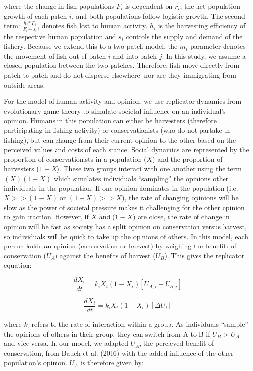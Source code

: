 \documentclass[
  12pt,
]{article}
\begin{document}
where the change in fish populations \(F_i\) is dependent on \(r_i\), the net population growth of each patch \(i\), and both populations follow logistic growth. The second term: \(\frac{h_i*F_i}{F_i + s_i}\), denotes fish lost to human activity. \(h_i\) is the harvesting efficiency of the respective human population and \(s_i\) controls the supply and demand of the fishery. Because we extend this to a two-patch model, the \(m_i\) parameter denotes the movement of fish out of patch \(i\) and into patch \(j\). In this study, we assume a closed population between the two patches. Therefore, fish move directly from patch to patch and do not disperse elsewhere, nor are they immigrating from outside areas.

For the model of human activity and opinion, we use replicator dynamics from evolutionary game theory to simulate societal influence on an individual's opinion. Humans in this population can either be harvesters (therefore participating in fishing activity) or conservationists (who do not partake in fishing), but can change from their current opinion to the other based on the perceived values and costs of each stance. Social dynamics are represented by the proportion of conservationists in a population (\(X\)) and the proportion of harvesters (\(1-X\)). These two groups interact with one another using the term \((X)(1-X)\) which simulates individuals ``sampling'' the opinions other individuals in the population. If one opinion dominates in the population (i.e.~\(X >> (1-X)\) or \((1-X) >> X\)), the rate of changing opinions will be slow as the power of societal pressure makes it challenging for the other opinion to gain traction. However, if \(X\) and (\(1-X\)) are close, the rate of change in opinion will be fast as society has a split opinion on conservation versus harvest, so individuals will be quick to take up the opinions of others. In this model, each person holds an opinion (conservation or harvest) by weighing the benefits of conservation (\(U_A\)) against the benefits of harvest (\(U_B\)). This gives the replicator equation:

\begin{equation} 
\frac{dX_i}{dt} = k_iX_i(1-X_i)[U_{A,i} - U_{B,i}]
  \label{eq:rep1}
\end{equation}

\begin{equation} 
\frac{dX_i}{dt} = k_iX_i(1-X_i)[\Delta U_i]
  \label{eq:rep2}
\end{equation}

where \(k_i\) refers to the rate of interaction within a group. As individuals ``sample'' the opinions of others in their group, they can switch from A to B if \(U_B\) \textgreater{} \(U_A\) and vice versa. In our model, we adapted \(U_A\), the percieved benefit of conservation, from Bauch et al. (2016) with the added influence of the other population's opinion. \(U_A\) is therefore given by:
\end{document}
